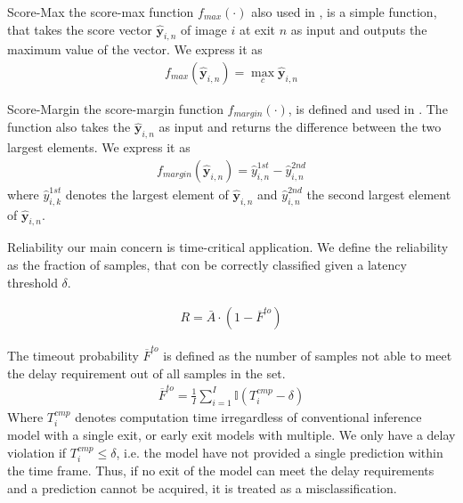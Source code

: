 \begin{enumdescript}
\begin{enumdescript}
			
			\item[Score-Max] the score-max function $ f_{max}(\cdot)$ also used in \cite{leroux_resource-constrained_2015}, is a simple function, that takes the score vector $ \bm{\hat{y}}_{i,n} $ of image $ i $ at exit $ n $ as input and outputs the maximum value of the vector. We express it as 
			\begin{align}
			f_{max}\left(\bm{\hat{y}}_{i,n}\right) = \underset{c}{\max} \bm{\hat{y}}_{i,n}
			\end{align}
			\item[Score-Margin] the score-margin function $ f_{margin}(\cdot)$, is defined and used in \cite{park_big/little_2015}. The function also takes the $ \bm{\hat{y}}_{i,n} $ as input and returns the difference between the two largest elements. We express it as
			\begin{align}
			f_{margin}\left(\bm{\hat{y}}_{i,n}\right) = \hat{y}_{i,n}^{1st} - \hat{y}_{i,n}^{2nd}
			\end{align}
			where $ \hat{y}_{i,k}^{1st} $ denotes the largest element of $ \bm{\hat{y}}_{i,n} $ 
			and $ \hat{y}_{i,n}^{2nd} $ the second largest element of $ \bm{\hat{y}}_{i,n} $.
			
		\end{enumdescript}
	
	\item[Reliability] our main concern is time-critical application. We define the reliability as the fraction of samples, that con be correctly classified given a latency threshold $ \delta $.
	
	\begin{align}
	R= \bar{A} \cdot (1-\overline{F}^{to})
	\end{align}
	
	The timeout probability $ \overline{F}^{to} $ is defined as the number of samples not able to meet the delay requirement out of all samples in the set.
	\begin{align}
	\overline{F}^{to}=\frac{1}{I}\sum_{i=1}^{I} \mathbb{I}\left(T_{i}^{cmp}-\delta\right)
	\end{align}
	Where $ T_{i}^{cmp} $ denotes computation time irregardless of conventional inference model with a single exit, or early exit models with multiple. We only have a delay violation if $ T_i^{cmp} \leq \delta $, i.e. the model have not provided a single prediction within the time frame. Thus, if no exit of the model can meet the delay requirements and a prediction cannot be acquired, it is treated as a misclassification. 
		

\end{enumdescript}
